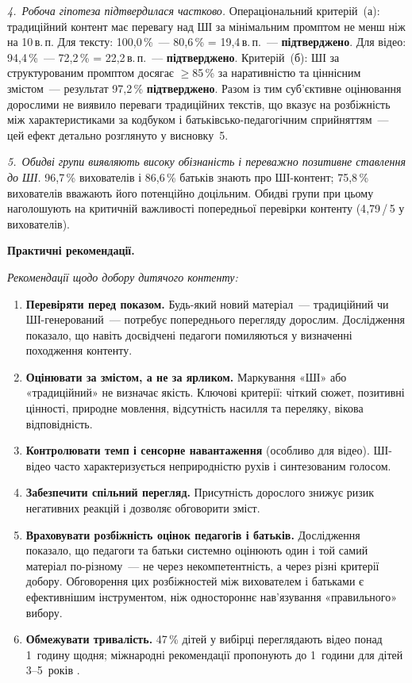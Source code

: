 \documentclass[14pt, a4paper]{extreport}
\begin{document}
\textit{4.~Робоча гіпотеза підтвердилася частково.} Операціональний критерій~(а): традиційний контент має перевагу над ШІ за мінімальним промптом не менш ніж на 10\,в.\,п. Для тексту: 100{,}0\,\%~--- 80{,}6\,\% = 19{,}4\,в.\,п.~--- \textbf{підтверджено}. Для відео: 94{,}4\,\%~--- 72{,}2\,\% = 22{,}2\,в.\,п.~--- \textbf{підтверджено}. Критерій~(б): ШІ за структурованим промптом досягає $\geq$85\,\% за наративністю та ціннісним змістом~--- результат 97{,}2\,\% \textbf{підтверджено}. Разом із тим суб'єктивне оцінювання дорослими не виявило переваги традиційних текстів, що вказує на розбіжність між характеристиками за кодбуком і батьківсько-педагогічним сприйняттям~--- цей ефект детально розглянуто у висновку~5.

\textit{5.~Обидві групи виявляють високу обізнаність і переважно позитивне ставлення до ШІ.} 96{,}7\,\% вихователів і 86{,}6\,\% батьків знають про ШІ-контент; 75{,}8\,\% вихователів вважають його потенційно доцільним. Обидві групи при цьому наголошують на критичній важливості попередньої перевірки контенту (4{,}79\,/\,5 у вихователів).

\textbf{Практичні рекомендації.}

\textit{Рекомендації щодо добору дитячого контенту:}
\begin{enumerate}
  \item \textbf{Перевіряти перед показом.} Будь-який новий матеріал~--- традиційний чи ШІ-генерований~--- потребує попереднього перегляду дорослим. Дослідження показало, що навіть досвідчені педагоги помиляються у визначенні походження контенту.
  \item \textbf{Оцінювати за змістом, а не за ярликом.} Маркування «ШІ» або «традиційний» не визначає якість. Ключові критерії: чіткий сюжет, позитивні цінності, природне мовлення, відсутність насилля та переляку, вікова відповідність.
  \item \textbf{Контролювати темп і сенсорне навантаження} (особливо для відео). ШІ-відео часто характеризується неприродністю рухів і синтезованим голосом.
  \item \textbf{Забезпечити спільний перегляд.} Присутність дорослого знижує ризик негативних реакцій і дозволяє обговорити зміст.
  \item \textbf{Враховувати розбіжність оцінок педагогів і батьків.} Дослідження показало, що педагоги та батьки системно оцінюють один і той самий матеріал по-різному~--- не через некомпетентність, а через різні критерії добору. Обговорення цих розбіжностей між вихователем і батьками є ефективнішим інструментом, ніж одностороннє нав'язування «правильного» вибору.
  \item \textbf{Обмежувати тривалість.} 47\,\% дітей у вибірці переглядають відео понад 1~годину щодня; міжнародні рекомендації пропонують до 1~години для дітей 3--5~років \cite{WHO2019,CPS2022}.
\end{enumerate}
\end{document}
